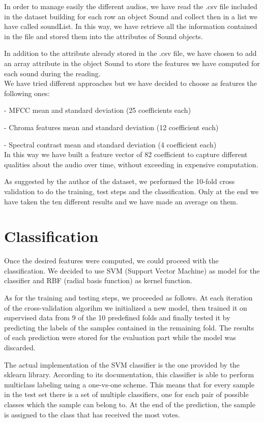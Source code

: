\documentclass[letterpaper, 12pt]{article}
\begin{document}
	In order to manage easily the different audios, we have read the .csv file included in the dataset building for each row an object Sound and collect then in a list we have called soundList. In this way, we have retrieve all the information contained in the file and stored them into the attributes of Sound objects.
	
	In addition to the attribute already stored in the .csv file, we have chosen to add an array attribute in the object Sound to store the features we have computed for each sound during the reading. 
	\\
	
	We have tried different approaches but we have decided to choose as features the following ones:
	
	-	MFCC mean and standard deviation (25 coefficients each)
	
	-	Chroma features mean and standard deviation (12 coefficient each)
	
	-	Spectral contrast mean and standard deviation (4 coefficient each)
	\\
	
	In this way we have built a feature vector of 82 coefficient to capture different qualities about the audio over time, without exceeding in expensive computation.
	
	As suggested by the author of the dataset, we performed the 10-fold cross validation to do the training, test steps and the classification. Only at the end we have taken the ten different results and we have made an average on them.
	
	\section{Classification}
	Once the desired features were computed, we could proceed with the classification. We decided to use SVM (Support Vector Machine) as model for the classifier and RBF (radial basis function) as kernel function.

As for the training and testing steps, we proceeded as follows. At each iteration of the cross-validation algorihm we initialized a new model, then trained it on supervised data from 9 of the 10 predefined folds and finally tested it by predicting the labels of the samples contained in the remaining fold. The results of each prediction were stored for the evaluation part while the model was discarded.

The actual implementation of the SVM classifier is the one provided by the sklearn library. According to its documentation, this classifier is able to perform multiclass labeling using a one-vs-one scheme. This means that for every sample in the test set there is a set of multiple classifiers, one for each pair of possible classes which the sample can belong to. At the end of the prediction, the sample is assigned to the class that has received the most votes.
\end{document}

